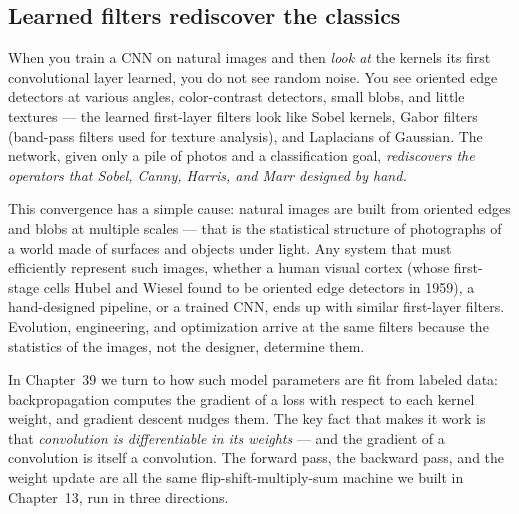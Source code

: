 \subsection{Learned filters rediscover the classics}

When you train a CNN on
natural images and then \emph{look at} the kernels its first convolutional
layer learned, you do not see random noise. You see oriented edge detectors at
various angles, color-contrast detectors, small blobs, and little textures ---
the learned first-layer filters look like Sobel kernels, Gabor
filters (band-pass filters used for texture analysis), and Laplacians of Gaussian. The network, given only a pile of photos
and a classification goal, \emph{rediscovers the operators that Sobel,
Canny, Harris, and Marr designed by hand.}

\begin{aestheticbox}
This convergence has a simple cause: natural images are built from oriented edges and blobs at multiple
scales --- that is the statistical structure of photographs of a world made of
surfaces and objects under light. Any system that must efficiently represent
such images, whether a human visual cortex (whose first-stage cells Hubel and
Wiesel found to be oriented edge detectors in 1959), a hand-designed pipeline,
or a trained CNN, ends up with similar first-layer filters. Evolution,
engineering, and optimization arrive at the same filters because the statistics
of the images, not the designer, determine them.
\end{aestheticbox}

\begin{connectionbox}
In Chapter~39 we turn to how such model parameters are fit from labeled data:
backpropagation computes the gradient of a loss with respect to each kernel
weight, and gradient descent nudges them. The key fact that makes it work is
that \emph{convolution is differentiable in its weights} --- and the gradient of a convolution is itself a convolution. The forward pass, the
backward pass, and the weight update are all the same flip-shift-multiply-sum
machine we built in Chapter~13, run in three directions.
\end{connectionbox}

